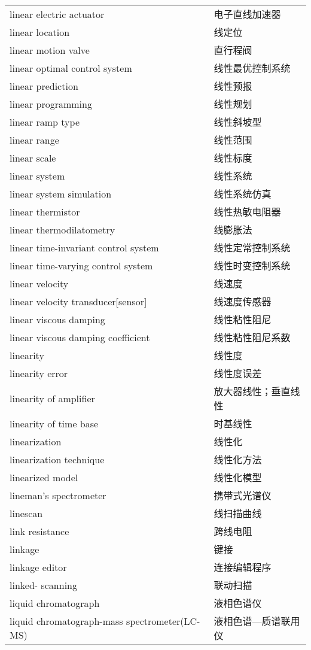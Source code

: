 \documentclass[
]{article}
\begin{document}
\begin{longtable}[]{@{}ll@{}}
linear electric actuator & 电子直线加速器 \\
linear location & 线定位 \\
linear motion valve & 直行程阀 \\
linear optimal control system & 线性最优控制系统 \\
linear prediction & 线性预报 \\
linear programming & 线性规划 \\
linear ramp type & 线性斜坡型 \\
linear range & 线性范围 \\
linear scale & 线性标度 \\
linear system & 线性系统 \\
linear system simulation & 线性系统仿真 \\
linear thermistor & 线性热敏电阻器 \\
linear thermodilatometry & 线膨胀法 \\
linear time-invariant control system & 线性定常控制系统 \\
linear time-varying control system & 线性时变控制系统 \\
linear velocity & 线速度 \\
linear velocity transducer{[}sensor{]} & 线速度传感器 \\
linear viscous damping & 线性粘性阻尼 \\
linear viscous damping coefficient & 线性粘性阻尼系数 \\
linearity & 线性度 \\
linearity error & 线性度误差 \\
linearity of amplifier & 放大器线性；垂直线性 \\
linearity of time base & 时基线性 \\
linearization & 线性化 \\
linearization technique & 线性化方法 \\
linearized model & 线性化模型 \\
lineman's spectrometer & 携带式光谱仪 \\
linescan & 线扫描曲线 \\
link resistance & 跨线电阻 \\
linkage & 键接 \\
linkage editor & 连接编辑程序 \\
linked- scanning & 联动扫描 \\
liquid chromatograph & 液相色谱仪 \\
liquid chromatograph-mass spectrometer(LC-MS) & 液相色谱---质谱联用仪 \\

\end{longtable}
\end{document}
